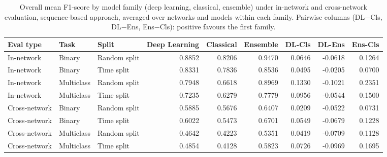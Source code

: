 \begin{table}
\caption{Overall mean F1-score by model family (deep learning, classical, ensemble) under in-network and cross-network evaluation, sequence-based approach, averaged over networks and models within each family. Pairwise columns (DL$-$Cls, DL$-$Ens, Ens$-$Cls): positive favours the first family.}
\label{tab:q6_overall}
\begin{tabular}{lllrrrrrr}
\toprule
Eval type & Task & Split & Deep Learning & Classical & Ensemble & DL-Cls & DL-Ens & Ens-Cls \\
\midrule
In-network & Binary & Random split & 0.8852 & 0.8206 & 0.9470 & 0.0646 & -0.0618 & 0.1264 \\
In-network & Binary & Time split & 0.8331 & 0.7836 & 0.8536 & 0.0495 & -0.0205 & 0.0700 \\
In-network & Multiclass & Random split & 0.7948 & 0.6618 & 0.8969 & 0.1330 & -0.1021 & 0.2351 \\
In-network & Multiclass & Time split & 0.7235 & 0.6279 & 0.7779 & 0.0956 & -0.0544 & 0.1500 \\
Cross-network & Binary & Random split & 0.5885 & 0.5676 & 0.6407 & 0.0209 & -0.0522 & 0.0731 \\
Cross-network & Binary & Time split & 0.6022 & 0.5473 & 0.6701 & 0.0549 & -0.0679 & 0.1228 \\
Cross-network & Multiclass & Random split & 0.4642 & 0.4223 & 0.5351 & 0.0419 & -0.0709 & 0.1128 \\
Cross-network & Multiclass & Time split & 0.4854 & 0.4128 & 0.5823 & 0.0726 & -0.0969 & 0.1695 \\
\bottomrule
\end{tabular}
\end{table}
